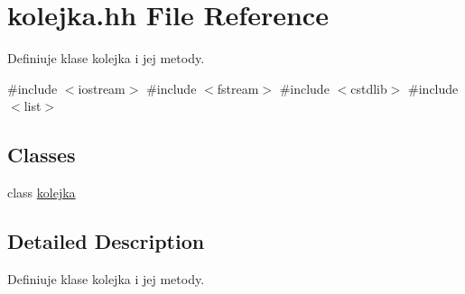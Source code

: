 \hypertarget{kolejka_8hh}{\section{kolejka.\-hh \-File \-Reference}
\label{kolejka_8hh}
}


\-Definiuje klase kolejka i jej metody.  


{\ttfamily \#include $<$iostream$>$}\*
{\ttfamily \#include $<$fstream$>$}\*
{\ttfamily \#include $<$cstdlib$>$}\*
{\ttfamily \#include $<$list$>$}\*
\subsection*{\-Classes}
\begin{DoxyCompactItemize}
\item 
class \hyperlink{classkolejka}{kolejka}
\end{DoxyCompactItemize}


\subsection{\-Detailed \-Description}
\-Definiuje klase kolejka i jej metody. 